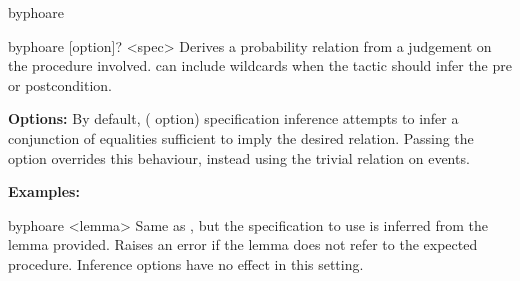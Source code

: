 \begin{tactic}{byphoare}
  \begin{tsyntax}{byphoare [option]? <spec>}
  Derives a probability relation from a \phl judgement on the
  procedure involved.  can include wildcards when the
  tactic should infer the pre or postcondition.

  \textbf{Options:} By default, ( option) specification
  inference attempts to infer a conjunction of equalities sufficient
  to imply the desired relation. Passing the  option
  overrides this behaviour, instead using the trivial relation on
  events.

  \textbf{Examples:}
  \end{tsyntax}

  \begin{tsyntax}{byphoare <lemma>}
  Same as , but the specification to use is
  inferred from the lemma provided. Raises an error if the lemma does
  not refer to the expected procedure. Inference options have no
  effect in this setting.
  \end{tsyntax}
\end{tactic}
